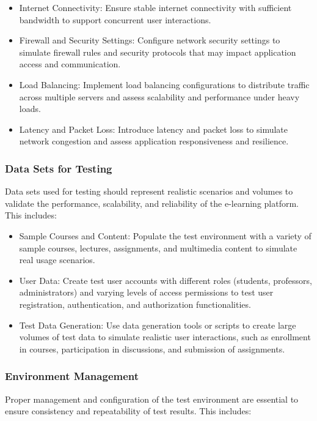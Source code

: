 		\begin{itemize}
			\item Internet Connectivity: Ensure stable internet connectivity with sufficient bandwidth to support concurrent user interactions.
			\item Firewall and Security Settings: Configure network security settings to simulate firewall rules and security protocols that may impact application access and communication.
			\item Load Balancing: Implement load balancing configurations to distribute traffic across multiple servers and assess scalability and performance under heavy loads.
			\item Latency and Packet Loss: Introduce latency and packet loss to simulate network congestion and assess application responsiveness and resilience.
		\end{itemize}
		
		\subsubsection{Data Sets for Testing}
		
		Data sets used for testing should represent realistic scenarios and volumes to validate the performance, scalability, and reliability of the e-learning platform. This includes:
		
		\begin{itemize}
			\item Sample Courses and Content: Populate the test environment with a variety of sample courses, lectures, assignments, and multimedia content to simulate real usage scenarios.
			\item User Data: Create test user accounts with different roles (students, professors, administrators) and varying levels of access permissions to test user registration, authentication, and authorization functionalities.
			\item Test Data Generation: Use data generation tools or scripts to create large volumes of test data to simulate realistic user interactions, such as enrollment in courses, participation in discussions, and submission of assignments.
		\end{itemize}
		
		\subsubsection{Environment Management}
		
		Proper management and configuration of the test environment are essential to ensure consistency and repeatability of test results. This includes:
		
